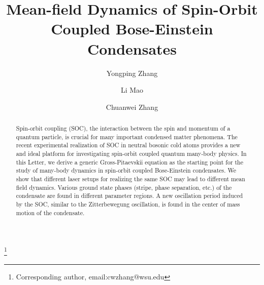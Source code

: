 \documentclass[prl,twocolumn,showpacs,floatfix]{revtex4}
\begin{document}
\title{Mean-field Dynamics of Spin-Orbit Coupled Bose-Einstein Condensates}
\author{Yongping Zhang}
\author{Li Mao}
\author{Chuanwei Zhang}
\thanks{Corresponding author, email:cwzhang@wsu.edu}

\begin{abstract}
Spin-orbit coupling (SOC), the interaction between the spin and momentum of
a quantum particle, is crucial for many important condensed matter
phenomena. The recent experimental realization of SOC in neutral bosonic
cold atoms provides a new and ideal platform for investigating spin-orbit
coupled quantum many-body physics. In this Letter, we derive a generic
Gross-Pitaevskii equation as the starting point for the study of many-body
dynamics in spin-orbit coupled Bose-Einstein condensates. We show that
different laser setups for realizing the same SOC may lead to different mean
field dynamics. Various ground state phases (stripe, phase separation, etc.)
of the condensate are found in different parameter regions. A new
oscillation period induced by the SOC, similar to the Zitterbewegung
oscillation, is found in the center of mass motion of the condensate.
\end{abstract}

\maketitle

\end{document}
